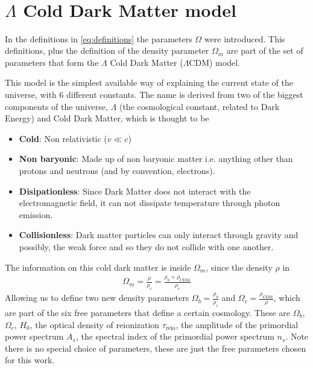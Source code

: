 \begin{align}
\end{align}

\section{$\Lambda$ Cold Dark Matter model}

In the definitions in \eqref{eq:definitions} the parameters $\Omega$ were introduced. This definitions, plus the definition of the density parameter $\Omega_m$ are part of the set of parameters that form the $\Lambda$ Cold Dark Matter ($\Lambda$CDM) model.

This model is the simplest available way of explaining the current state of the universe, with 6 different constants. The name is derived from two of the biggest components of the universe, $\Lambda$ (the cosmological constant, related to Dark Energy) and Cold Dark Matter, which is thought to be
\begin{itemize}
	\item \textbf{Cold}: Non relativistic ($v \ll c$)
	\item \textbf{Non baryonic}: Made up of non baryonic matter i.e. anything other than protons and neutrons (and by convention, electrons).
	\item \textbf{Disipationless}: Since Dark Matter does not interact with the electromagnetic field, it can not dissipate temperature through photon emission.
	\item \textbf{Collisionless}: Dark matter particles can only interact through gravity and possibly, the weak force and so they do not collide with one another.
\end{itemize}
The information on this cold dark matter is inside $\Omega_m$, since the density $\rho$ in
\begin{align}
	\Omega_m = \frac{\rho}{\rho_c} = \frac{\rho_b + \rho_{\text{CDM}}}{\rho_c}
\end{align}
Allowing us to define two new density parameters $\Omega_b = \frac{\rho_b}{\rho_c}$ and $\Omega_c =  \frac{\rho_\text{CDM}}{\rho}$, which are part of the six free parameters that define a certain cosmology. These are $\Omega_b$, $\Omega_c$, $H_0$, the optical density of reionization $\tau_{\text{reio}}$, the amplitude of the primordial power spectrum $A_s$, the spectral index of the primordial power spectrum $n_s$. Note there is no special choice of parameters, these are just the free parameters chosen for this work.

